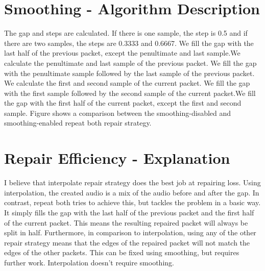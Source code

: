 \documentclass{article} %
\begin{document}
\section{Smoothing - Algorithm Description}

The gap and steps are calculated. If there is one sample, the step is 0.5 and if there are two samples, the steps are 0.3333 and 0.6667. We fill the gap with the last half of the previous packet, except the penultimate and last sample.We calculate the penultimate and last sample of the previous packet. We fill the gap with the penultimate sample followed by the last sample of the previous packet. We calculate the first and second sample of the current packet. We fill the gap with the first sample followed by the second sample of the current packet.We fill the gap with the first half of the current packet, except the first and second sample. Figure shows a comparison between the smoothing-disabled and smoothing-enabled repeat both repair strategy.

\begin{figure}[!htbp]
\centering
{}
\end{figure}

\section{Repair Efficiency - Explanation}

I believe that interpolate repair strategy does the best job at repairing loss. Using interpolation, the created audio is a mix of the audio before and after the gap. In contrast, repeat both tries to achieve this, but tackles the problem in a basic way. It simply fills the gap with the last half of the previous packet and the first half of the current packet. This means the resulting repaired packet will always be split in half. Furthermore, in comparison to interpolation, using any of the other repair strategy means that the edges of the repaired packet will not match the edges of the other packets. This can be fixed using smoothing, but requires further work. Interpolation doesn't require smoothing.
\end{document}
